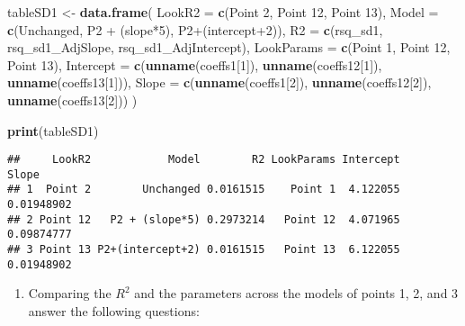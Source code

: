 \documentclass[
]{book}
\newenvironment{Shaded}{\begin{snugshade}}{\end{snugshade}}
\newcommand{\AttributeTok}[1]{\textcolor[rgb]{0.13,0.29,0.53}{#1}}
\newcommand{\DecValTok}[1]{\textcolor[rgb]{0.00,0.00,0.81}{#1}}
\newcommand{\FunctionTok}[1]{\textcolor[rgb]{0.13,0.29,0.53}{\textbf{#1}}}
\newcommand{\NormalTok}[1]{#1}
\newcommand{\OtherTok}[1]{\textcolor[rgb]{0.56,0.35,0.01}{#1}}
\newcommand{\StringTok}[1]{\textcolor[rgb]{0.31,0.60,0.02}{#1}}
\providecommand{\tightlist}{%
  \setlength{\itemsep}{0pt}\setlength{\parskip}{0pt}}
\begin{document}
\begin{Shaded}
\begin{Highlighting}[]
\NormalTok{tableSD1 }\OtherTok{\textless{}{-}} \FunctionTok{data.frame}\NormalTok{(}
  \AttributeTok{LookR2 =} \FunctionTok{c}\NormalTok{(}\StringTok{\textquotesingle{}Point 2\textquotesingle{}}\NormalTok{, }\StringTok{\textquotesingle{}Point 12\textquotesingle{}}\NormalTok{, }\StringTok{\textquotesingle{}Point 13\textquotesingle{}}\NormalTok{),}
  \AttributeTok{Model =} \FunctionTok{c}\NormalTok{(}\StringTok{\textquotesingle{}Unchanged\textquotesingle{}}\NormalTok{, }\StringTok{\textquotesingle{}P2 + (slope*5)\textquotesingle{}}\NormalTok{, }\StringTok{\textquotesingle{}P2+(intercept+2)\textquotesingle{}}\NormalTok{),}
  \AttributeTok{R2 =} \FunctionTok{c}\NormalTok{(rsq\_sd1, rsq\_sd1\_AdjSlope, rsq\_sd1\_AdjIntercept),    }
  \AttributeTok{LookParams =} \FunctionTok{c}\NormalTok{(}\StringTok{\textquotesingle{}Point 1\textquotesingle{}}\NormalTok{, }\StringTok{\textquotesingle{}Point 12\textquotesingle{}}\NormalTok{, }\StringTok{\textquotesingle{}Point 13\textquotesingle{}}\NormalTok{),}
  \AttributeTok{Intercept =} \FunctionTok{c}\NormalTok{(}\FunctionTok{unname}\NormalTok{(coeffs1[}\DecValTok{1}\NormalTok{]), }\FunctionTok{unname}\NormalTok{(coeffs12[}\DecValTok{1}\NormalTok{]), }\FunctionTok{unname}\NormalTok{(coeffs13[}\DecValTok{1}\NormalTok{])),    }
  \AttributeTok{Slope =} \FunctionTok{c}\NormalTok{(}\FunctionTok{unname}\NormalTok{(coeffs1[}\DecValTok{2}\NormalTok{]), }\FunctionTok{unname}\NormalTok{(coeffs12[}\DecValTok{2}\NormalTok{]), }\FunctionTok{unname}\NormalTok{(coeffs13[}\DecValTok{2}\NormalTok{]))}
\NormalTok{)}


\FunctionTok{print}\NormalTok{(tableSD1)}
\end{Highlighting}
\end{Shaded}

\begin{verbatim}
##     LookR2            Model        R2 LookParams Intercept      Slope
## 1  Point 2        Unchanged 0.0161515    Point 1  4.122055 0.01948902
## 2 Point 12   P2 + (slope*5) 0.2973214   Point 12  4.071965 0.09874777
## 3 Point 13 P2+(intercept+2) 0.0161515   Point 13  6.122055 0.01948902
\end{verbatim}

\begin{enumerate}
\def\labelenumi{\arabic{enumi}.}
\setcounter{enumi}{15}
\tightlist
\item
  Comparing the \(R^2\) and the parameters across the models of points 1, 2, and 3 answer the following questions:
\end{enumerate}
\end{document}
